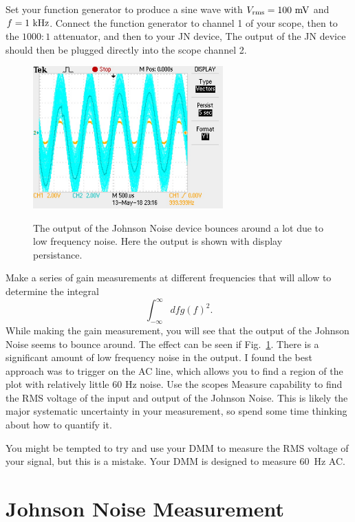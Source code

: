 \documentclass[12pt]{article}
\begin{document}
Set your function generator to produce a sine wave with $V_{\rm rms} = 100~\rm mV$ and $f = 1~\rm kHz$.  Connect the function generator to channel 1 of your scope, then to the $1000:1$ attenuator, and then to your JN device,  The output of the JN device should then be plugged directly into the scope channel 2.

\begin{figure}[htbp]
\begin{center}
{\includegraphics[width=0.65\textwidth]{figs/gaintrouble.jpg}}
\end{center}
\caption{\label{fig:gaintrouble} The output of the Johnson Noise device bounces around a lot due to low frequency noise.  Here the output is shown with display persistance.}
\end{figure}

Make a series of gain measurements at different frequencies that will allow to determine the integral
\begin{displaymath}
\int_{-\infty}^{\infty} df g(f)^2.
\end{displaymath}
While making the gain measurement, you will see that the output of the Johnson Noise seems to bounce around.  The effect can be seen if Fig.~\ref{fig:gaintrouble}.  There is a significant amount of low frequency noise in the output.  I found the best approach was to trigger on the AC line, which allows you to find a region of the plot with relatively little 60 Hz noise.  Use the scopes Measure capability to find the RMS voltage of the input and output of the Johnson Noise.  This is likely the major systematic uncertainty in your measurement, so spend some time thinking about how to quantify it. 

You might be tempted to try and use your DMM to measure the RMS voltage of your signal, but this is a mistake.  Your DMM is designed to measure 60~\rm Hz AC.

\section{Johnson Noise Measurement}
\end{document}
